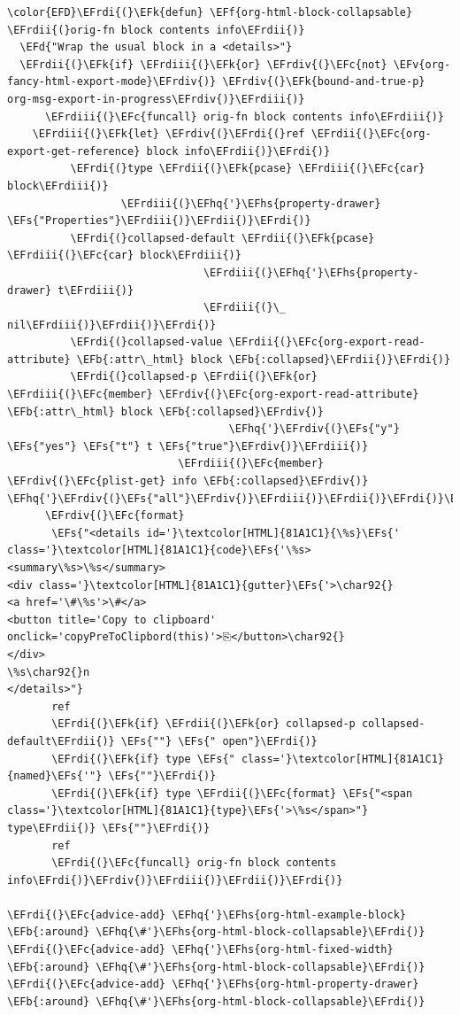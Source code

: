 \documentclass{scrartcl}
\newcommand{\EFk}[1]{\textcolor{EFk}{#1}} %
\newcommand{\EFd}[1]{\textcolor{EFd}{#1}} %
\newcommand{\EFs}[1]{\textcolor{EFs}{#1}} %
\newcommand{\EFb}[1]{\textcolor{EFb}{#1}} %
\newcommand{\EFc}[1]{\textcolor{EFc}{#1}} %
\newcommand{\EFv}[1]{\textcolor{EFv}{#1}} %
\newcommand{\EFf}[1]{\textcolor{EFf}{#1}} %
\newcommand{\EFhq}[1]{#1} %
\newcommand{\EFhs}[1]{#1} %
\newcommand{\EFrdi}[1]{#1} %
\newcommand{\EFrdii}[1]{#1} %
\newcommand{\EFrdiii}[1]{#1} %
\newcommand{\EFrdiv}[1]{#1} %
\begin{document}
\begin{Code}
\begin{Verbatim}[]
\color{EFD}\EFrdi{(}\EFk{defun} \EFf{org-html-block-collapsable} \EFrdii{(}orig-fn block contents info\EFrdii{)}
  \EFd{"Wrap the usual block in a <details>"}
  \EFrdii{(}\EFk{if} \EFrdiii{(}\EFk{or} \EFrdiv{(}\EFc{not} \EFv{org-fancy-html-export-mode}\EFrdiv{)} \EFrdiv{(}\EFk{bound-and-true-p} org-msg-export-in-progress\EFrdiv{)}\EFrdiii{)}
      \EFrdiii{(}\EFc{funcall} orig-fn block contents info\EFrdiii{)}
    \EFrdiii{(}\EFk{let} \EFrdiv{(}\EFrdi{(}ref \EFrdii{(}\EFc{org-export-get-reference} block info\EFrdii{)}\EFrdi{)}
          \EFrdi{(}type \EFrdii{(}\EFk{pcase} \EFrdiii{(}\EFc{car} block\EFrdiii{)}
                  \EFrdiii{(}\EFhq{'}\EFhs{property-drawer} \EFs{"Properties"}\EFrdiii{)}\EFrdii{)}\EFrdi{)}
          \EFrdi{(}collapsed-default \EFrdii{(}\EFk{pcase} \EFrdiii{(}\EFc{car} block\EFrdiii{)}
                               \EFrdiii{(}\EFhq{'}\EFhs{property-drawer} t\EFrdiii{)}
                               \EFrdiii{(}\_ nil\EFrdiii{)}\EFrdii{)}\EFrdi{)}
          \EFrdi{(}collapsed-value \EFrdii{(}\EFc{org-export-read-attribute} \EFb{:attr\_html} block \EFb{:collapsed}\EFrdii{)}\EFrdi{)}
          \EFrdi{(}collapsed-p \EFrdii{(}\EFk{or} \EFrdiii{(}\EFc{member} \EFrdiv{(}\EFc{org-export-read-attribute} \EFb{:attr\_html} block \EFb{:collapsed}\EFrdiv{)}
                                   \EFhq{'}\EFrdiv{(}\EFs{"y"} \EFs{"yes"} \EFs{"t"} t \EFs{"true"}\EFrdiv{)}\EFrdiii{)}
                           \EFrdiii{(}\EFc{member} \EFrdiv{(}\EFc{plist-get} info \EFb{:collapsed}\EFrdiv{)} \EFhq{'}\EFrdiv{(}\EFs{"all"}\EFrdiv{)}\EFrdiii{)}\EFrdii{)}\EFrdi{)}\EFrdiv{)}
      \EFrdiv{(}\EFc{format}
       \EFs{"<details id='}\textcolor[HTML]{81A1C1}{\%s}\EFs{' class='}\textcolor[HTML]{81A1C1}{code}\EFs{'\%s>
<summary\%s>\%s</summary>
<div class='}\textcolor[HTML]{81A1C1}{gutter}\EFs{'>\char92{}
<a href='\#\%s'>\#</a>
<button title='Copy to clipboard' onclick='copyPreToClipbord(this)'>⎘</button>\char92{}
</div>
\%s\char92{}n
</details>"}
       ref
       \EFrdi{(}\EFk{if} \EFrdii{(}\EFk{or} collapsed-p collapsed-default\EFrdii{)} \EFs{""} \EFs{" open"}\EFrdi{)}
       \EFrdi{(}\EFk{if} type \EFs{" class='}\textcolor[HTML]{81A1C1}{named}\EFs{'"} \EFs{""}\EFrdi{)}
       \EFrdi{(}\EFk{if} type \EFrdii{(}\EFc{format} \EFs{"<span class='}\textcolor[HTML]{81A1C1}{type}\EFs{'>\%s</span>"} type\EFrdii{)} \EFs{""}\EFrdi{)}
       ref
       \EFrdi{(}\EFc{funcall} orig-fn block contents info\EFrdi{)}\EFrdiv{)}\EFrdiii{)}\EFrdii{)}\EFrdi{)}

\EFrdi{(}\EFc{advice-add} \EFhq{'}\EFhs{org-html-example-block}   \EFb{:around} \EFhq{\#'}\EFhs{org-html-block-collapsable}\EFrdi{)}
\EFrdi{(}\EFc{advice-add} \EFhq{'}\EFhs{org-html-fixed-width}     \EFb{:around} \EFhq{\#'}\EFhs{org-html-block-collapsable}\EFrdi{)}
\EFrdi{(}\EFc{advice-add} \EFhq{'}\EFhs{org-html-property-drawer} \EFb{:around} \EFhq{\#'}\EFhs{org-html-block-collapsable}\EFrdi{)}
\end{Verbatim}
\end{Code}
\end{document}

